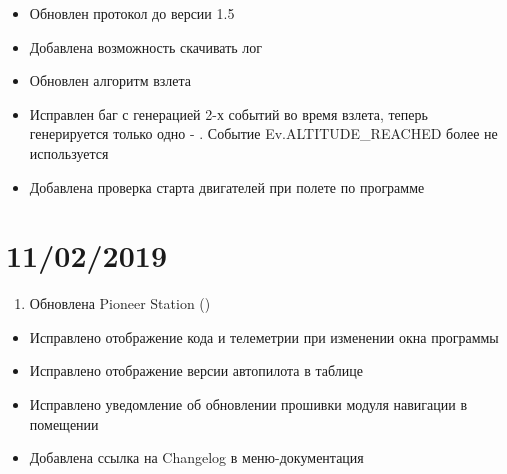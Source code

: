 \documentclass[a4paper,10pt,russian]{sphinxmanual}
\begin{document}
\begin{itemize}
\item {} 
Обновлен протокол до версии 1.5

\item {} 
Добавлена возможность скачивать лог

\item {} 
Обновлен алгоритм взлета

\item {} 
Исправлен баг с генерацией 2-х событий во время взлета, теперь генерируется только одно - . Событие Ev.ALTITUDE\_REACHED более не используется

\item {} 
Добавлена проверка старта двигателей при полете по программе

\end{itemize}


\section{11/02/2019}
\label{\detokenize{changelog:id3}}\begin{enumerate}
\def\theenumi{\arabic{enumi}}
\def\labelenumi{\theenumi .}
\makeatletter\def\p@enumii{\p@enumi \theenumi .}\makeatother
\item {} 
Обновлена Pioneer Station ()

\end{enumerate}
\begin{itemize}
\item {} 
Исправлено отображение кода и телеметрии при изменении окна программы

\item {} 
Исправлено отображение версии автопилота в таблице

\item {} 
Исправлено уведомление об обновлении прошивки модуля навигации в помещении

\item {} 
Добавлена ссылка на Changelog в меню-документация

\end{itemize}
\end{document}

